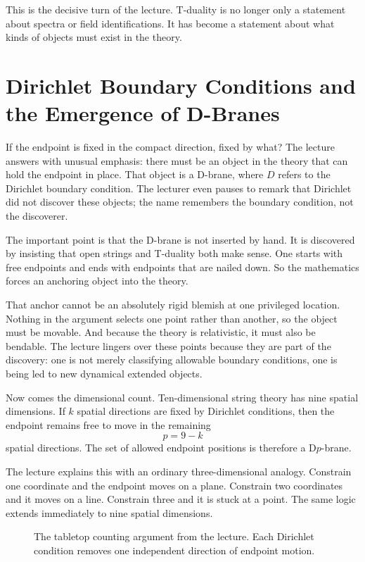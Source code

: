 This is the decisive turn of the lecture. T-duality is no longer only a statement about spectra or field identifications. It has become a statement about what kinds of objects must exist in the theory.

\section{Dirichlet Boundary Conditions and the Emergence of D-Branes}

If the endpoint is fixed in the compact direction, fixed by what? The lecture answers with unusual emphasis: there must be an object in the theory that can hold the endpoint in place. That object is a D-brane, where \(D\) refers to the Dirichlet boundary condition. The lecturer even pauses to remark that Dirichlet did not discover these objects; the name remembers the boundary condition, not the discoverer.

The important point is that the D-brane is not inserted by hand. It is discovered by insisting that open strings and T-duality both make sense. One starts with free endpoints and ends with endpoints that are nailed down. So the mathematics forces an anchoring object into the theory.

That anchor cannot be an absolutely rigid blemish at one privileged location. Nothing in the argument selects one point rather than another, so the object must be movable. And because the theory is relativistic, it must also be bendable. The lecture lingers over these points because they are part of the discovery: one is not merely classifying allowable boundary conditions, one is being led to new dynamical extended objects.

Now comes the dimensional count. Ten-dimensional string theory has nine spatial dimensions. If \(k\) spatial directions are fixed by Dirichlet conditions, then the endpoint remains free to move in the remaining
\begin{equation}
p=9-k
\end{equation}
spatial directions. The set of allowed endpoint positions is therefore a D\(p\)-brane.

The lecture explains this with an ordinary three-dimensional analogy. Constrain one coordinate and the endpoint moves on a plane. Constrain two coordinates and it moves on a line. Constrain three and it is stuck at a point. The same logic extends immediately to nine spatial dimensions.

\begin{figure}[htbp]
\centering
{}
\caption{The tabletop counting argument from the lecture. Each Dirichlet condition removes one independent direction of endpoint motion.}
\end{figure}


